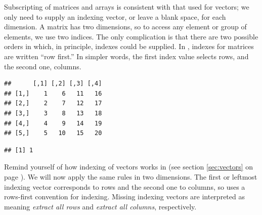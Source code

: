 \documentclass[krantz2]{krantz}\usepackage{knitr}
\begin{document}
Subscripting of matrices and arrays is consistent with that used for vectors; we only need to supply an indexing vector, or leave a blank space, for each dimension. A matrix has two dimensions, so to access any element or group of elements, we use two indices. The only complication is that there are two possible orders in which, in principle, indexes could be supplied. In \Rlang, indexes for matrices are written ``row first.'' In simpler words, the first index value selects rows, and the second one, columns.

\begin{knitrout}\footnotesize
{}\color{fgcolor}\begin{kframe}
\begin{alltt}
 \hlkwb{<-} \hlstd{(}\hlopt{:}\hlstd{,}  \hlstd{=} \hlstd{)}
\end{alltt}
\begin{verbatim}
##      [,1] [,2] [,3] [,4]
## [1,]    1    6   11   16
## [2,]    2    7   12   17
## [3,]    3    8   13   18
## [4,]    4    9   14   19
## [5,]    5   10   15   20
\end{verbatim}
\begin{alltt}
\hlstd{A[}\hlstd{,} \hlstd{]}
\end{alltt}
\begin{verbatim}
## [1] 1
\end{verbatim}
\end{kframe}
\end{knitrout}

Remind yourself of how indexing of vectors works in \Rlang (see section \ref{sec:vectors} on page \pageref{sec:vectors}). We will now apply the same rules in two dimensions. The first or leftmost indexing vector corresponds to rows and the second one to columns, so \Rlang uses a rows-first convention for indexing. Missing indexing vectors are interpreted as meaning \emph{extract all rows} and \emph{extract all columns}, respectively.
\end{document}
